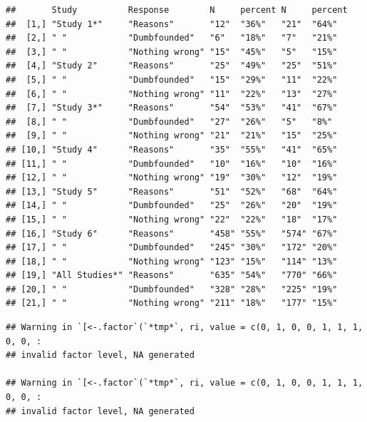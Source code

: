 \documentclass[
  american,
  man,floatsintext]{apa7}
\begin{document}
\begin{verbatim}
##       Study          Response        N     percent N     percent
##  [1,] "Study 1*"     "Reasons"       "12"  "36%"   "21"  "64%"  
##  [2,] " "            "Dumbfounded"   "6"   "18%"   "7"   "21%"  
##  [3,] " "            "Nothing wrong" "15"  "45%"   "5"   "15%"  
##  [4,] "Study 2"      "Reasons"       "25"  "49%"   "25"  "51%"  
##  [5,] " "            "Dumbfounded"   "15"  "29%"   "11"  "22%"  
##  [6,] " "            "Nothing wrong" "11"  "22%"   "13"  "27%"  
##  [7,] "Study 3*"     "Reasons"       "54"  "53%"   "41"  "67%"  
##  [8,] " "            "Dumbfounded"   "27"  "26%"   "5"   "8%"   
##  [9,] " "            "Nothing wrong" "21"  "21%"   "15"  "25%"  
## [10,] "Study 4"      "Reasons"       "35"  "55%"   "41"  "65%"  
## [11,] " "            "Dumbfounded"   "10"  "16%"   "10"  "16%"  
## [12,] " "            "Nothing wrong" "19"  "30%"   "12"  "19%"  
## [13,] "Study 5"      "Reasons"       "51"  "52%"   "68"  "64%"  
## [14,] " "            "Dumbfounded"   "25"  "26%"   "20"  "19%"  
## [15,] " "            "Nothing wrong" "22"  "22%"   "18"  "17%"  
## [16,] "Study 6"      "Reasons"       "458" "55%"   "574" "67%"  
## [17,] " "            "Dumbfounded"   "245" "30%"   "172" "20%"  
## [18,] " "            "Nothing wrong" "123" "15%"   "114" "13%"  
## [19,] "All Studies*" "Reasons"       "635" "54%"   "770" "66%"  
## [20,] " "            "Dumbfounded"   "328" "28%"   "225" "19%"  
## [21,] " "            "Nothing wrong" "211" "18%"   "177" "15%"
\end{verbatim}

\begin{verbatim}
## Warning in `[<-.factor`(`*tmp*`, ri, value = c(0, 1, 0, 0, 1, 1, 1, 0, 0, :
## invalid factor level, NA generated

## Warning in `[<-.factor`(`*tmp*`, ri, value = c(0, 1, 0, 0, 1, 1, 1, 0, 0, :
## invalid factor level, NA generated
\end{verbatim}
\end{document}
